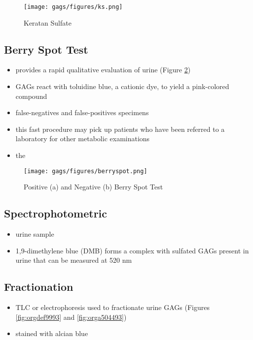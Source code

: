 \documentclass[12pt]{scrartcl}
\begin{document}
\begin{figure}[htbp]
\centering
\texttt{[image: gags/figures/ks.png]}
\caption{\label{fig:orgf6b984a}Keratan Sulfate}
\end{figure}


\subsection{Berry Spot Test}
\label{sec:org6266ef4}
\begin{itemize}
\item provides a rapid qualitative evaluation of urine (Figure \ref{fig:org7a9daf7})
\item GAGs react with toluidine blue, a cationic dye, to yield a pink-colored compound
\item false-negatives and false-positives specimens
\item this fast procedure may pick up patients who have been referred to a
laboratory for other metabolic examinations
\item the
\end{itemize}

\begin{figure}[htbp]
\centering
\texttt{[image: gags/figures/berryspot.png]}
\caption{\label{fig:org7a9daf7}Positive (a) and Negative (b) Berry Spot Test}
\end{figure}


\subsection{Spectrophotometric}
\label{sec:org9364aa9}
\begin{itemize}
\item urine sample
\item 1,9-dimethylene blue (DMB) forms a complex with sulfated GAGs
present in urine that can be measured at 520 nm
\end{itemize}


\subsection{Fractionation}
\label{sec:org19c9c40}
\begin{itemize}
\item TLC or electrophoresis used to fractionate urine GAGs (Figures \ref{fig:orgdef9993} and \ref{fig:orga504493})
\item stained with alcian blue
\end{itemize}
\end{document}
